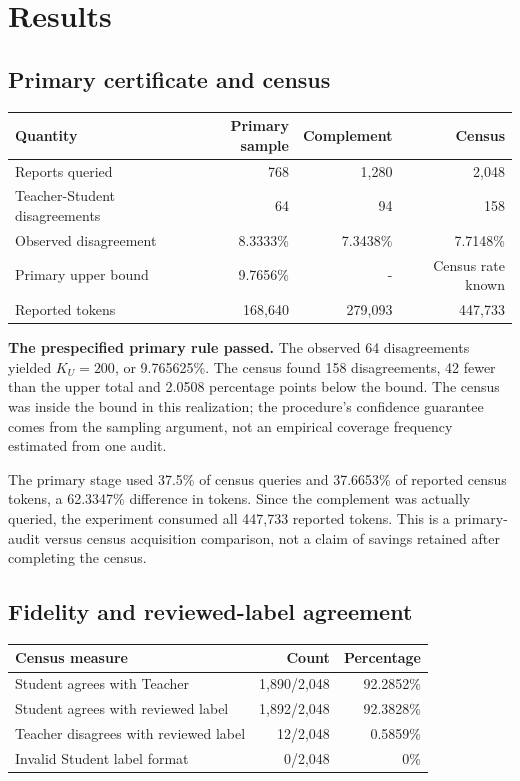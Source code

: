 \documentclass[
  10pt,
]{article}
\let\oldsection\section
\renewcommand{\section}{\needspace{5\baselineskip}\oldsection}
\begin{document}
\hypertarget{results}{%
\section{Results}\label{results}}

\hypertarget{primary-certificate-and-census}{%
\subsection{Primary certificate and
census}\label{primary-certificate-and-census}}

\begin{longtable}[]{@{}lrrr@{}}
\toprule\noalign{}
Quantity & Primary sample & Complement & Census \\
\midrule\noalign{}
\endhead
\bottomrule\noalign{}
\endlastfoot
Reports queried & 768 & 1,280 & 2,048 \\
Teacher-Student disagreements & 64 & 94 & 158 \\
Observed disagreement & 8.3333\% & 7.3438\% & 7.7148\% \\
Primary upper bound & 9.7656\% & - & Census rate known \\
Reported tokens & 168,640 & 279,093 & 447,733 \\
\end{longtable}

\textbf{The prespecified primary rule passed.} The observed 64
disagreements yielded \(K_U=200\), or 9.765625\%. The census found 158
disagreements, 42 fewer than the upper total and 2.0508 percentage
points below the bound. The census was inside the bound in this
realization; the procedure's confidence guarantee comes from the
sampling argument, not an empirical coverage frequency estimated from
one audit.

The primary stage used 37.5\% of census queries and 37.6653\% of
reported census tokens, a 62.3347\% difference in tokens. Since the
complement was actually queried, the experiment consumed all 447,733
reported tokens. This is a primary-audit versus census acquisition
comparison, not a claim of savings retained after completing the census.

\hypertarget{fidelity-and-reviewed-label-agreement}{%
\subsection{Fidelity and reviewed-label
agreement}\label{fidelity-and-reviewed-label-agreement}}

\begin{longtable}[]{@{}lrr@{}}
\toprule\noalign{}
Census measure & Count & Percentage \\
\midrule\noalign{}
\endhead
\bottomrule\noalign{}
\endlastfoot
Student agrees with Teacher & 1,890/2,048 & 92.2852\% \\
Student agrees with reviewed label & 1,892/2,048 & 92.3828\% \\
Teacher disagrees with reviewed label & 12/2,048 & 0.5859\% \\
Invalid Student label format & 0/2,048 & 0\% \\
\end{longtable}
\end{document}
